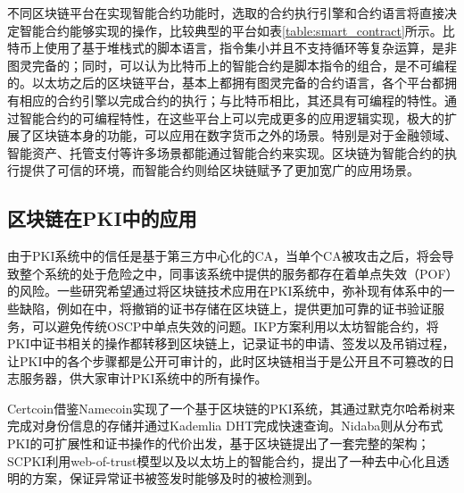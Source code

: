 不同区块链平台在实现智能合约功能时，选取的合约执行引擎和合约语言将直接决定智能合约能够实现的操作，比较典型的平台如表\ref{table:smart_contract}所示。比特币上使用了基于堆栈式的脚本语言，指令集小并且不支持循环等复杂运算，是非图灵完备的；同时，可以认为比特币上的智能合约是脚本指令的组合，是不可编程的。以太坊之后的区块链平台，基本上都拥有图灵完备的合约语言，各个平台都拥有相应的合约引擎以完成合约的执行；与比特币相比，其还具有可编程的特性。通过智能合约的可编程特性，在这些平台上可以完成更多的应用逻辑实现，极大的扩展了区块链本身的功能，可以应用在数字货币之外的场景。特别是对于金融领域、智能资产、托管支付等许多场景都能通过智能合约来实现。区块链为智能合约的执行提供了可信的环境，而智能合约则给区块链赋予了更加宽广的应用场景。





\subsection{区块链在PKI中的应用}




由于PKI系统中的信任是基于第三方中心化的CA，当单个CA被攻击之后，将会导致整个系统的处于危险之中，同事该系统中提供的服务都存在着单点失效（POF）的风险。一些研究希望通过将区块链技术应用在PKI系统中，弥补现有体系中的一些缺陷，例如在\parencite{baldi2017certificate}中，将撤销的证书存储在区块链上，提供更加可靠的证书验证服务，可以避免传统OSCP中单点失效的问题。IKP\cite{matsumoto2016ikp}方案利用以太坊智能合约，将PKI中证书相关的操作都转移到区块链上，记录证书的申请、签发以及吊销过程，让PKI中的各个步骤都是公开可审计的，此时区块链相当于是公开且不可篡改的日志服务器，供大家审计PKI系统中的所有操作。



Certcoin\cite{fromknecht2014decentralized}借鉴Namecoin实现了一个基于区块链的PKI系统，其通过默克尔哈希树来完成对身份信息的存储并通过Kademlia DHT完成快速查询。Nidaba\cite{rystsovnidaba}则从分布式PKI的可扩展性和证书操作的代价出发，基于区块链提出了一套完整的架构；SCPKI\cite{al2017scpki}利用web-of-trust模型以及以太坊上的智能合约，提出了一种去中心化且透明的方案，保证异常证书被签发时能够及时的被检测到。



























